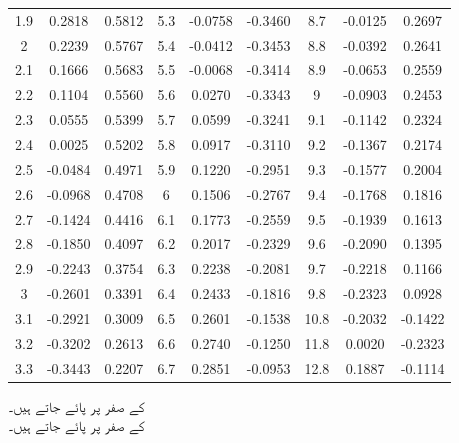 \begin{table}
\begin{otherlanguage}{english}
\begin{tabular}{|C|C|C||C|C|C||C|C|C|}
1.9 & 0.2818 & 0.5812 & 5.3 & -0.0758 & -0.3460 & 8.7 & -0.0125 & 0.2697 \\[1ex]
2 & 0.2239 & 0.5767 & 5.4 & -0.0412 & -0.3453 & 8.8 & -0.0392 & 0.2641 \\
2.1 & 0.1666 & 0.5683 & 5.5 & -0.0068 & -0.3414 & 8.9 & -0.0653 & 0.2559 \\
2.2 & 0.1104 & 0.5560 & 5.6 & 0.0270 & -0.3343 & 9 & -0.0903 & 0.2453 \\
2.3 & 0.0555 & 0.5399 & 5.7 & 0.0599 & -0.3241 & 9.1 & -0.1142 & 0.2324 \\
2.4 & 0.0025 & 0.5202 & 5.8 & 0.0917 & -0.3110 & 9.2 & -0.1367 & 0.2174 \\[1ex]
2.5 & -0.0484 & 0.4971 & 5.9 & 0.1220 & -0.2951 & 9.3 & -0.1577 & 0.2004 \\
2.6 & -0.0968 & 0.4708 & 6 & 0.1506 & -0.2767 & 9.4 & -0.1768 & 0.1816 \\
2.7 & -0.1424 & 0.4416 & 6.1 & 0.1773 & -0.2559 & 9.5 & -0.1939 & 0.1613 \\
2.8 & -0.1850 & 0.4097 & 6.2 & 0.2017 & -0.2329 & 9.6 & -0.2090 & 0.1395 \\
2.9 & -0.2243 & 0.3754 & 6.3 & 0.2238 & -0.2081 & 9.7 & -0.2218 & 0.1166 \\[1ex]
3 & -0.2601 & 0.3391 & 6.4 & 0.2433 & -0.1816 & 9.8 & -0.2323 & 0.0928 \\
3.1 & -0.2921 & 0.3009 & 6.5 & 0.2601 & -0.1538 & 10.8 & -0.2032 & -0.1422 \\
3.2 & -0.3202 & 0.2613 & 6.6 & 0.2740 & -0.1250 & 11.8 & 0.0020 & -0.2323 \\
3.3 & -0.3443 & 0.2207 & 6.7 & 0.2851 & -0.0953 & 12.8 & 0.1887 & -0.1114 \\
\hline
\end{tabular}
\end{otherlanguage}
\end{table}
\FloatBarrier
{} کے صفر  پر پائے جاتے ہیں۔\\
 کے صفر  پر پائے جاتے ہیں۔
\FloatBarrier
